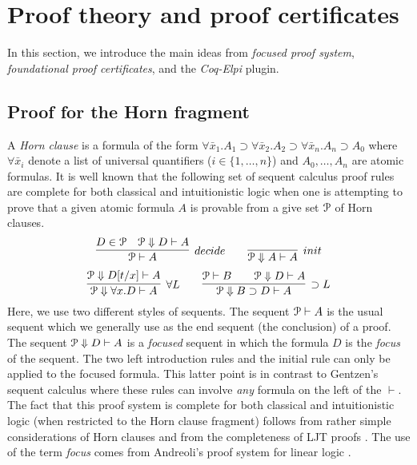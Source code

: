 \section{Proof theory and proof certificates}
\label{sec:three}

In this section, we introduce the main ideas from \emph{focused proof
  system}, \emph{foundational proof certificates}, and the
\emph{Coq-Elpi} plugin.

\subsection{Proof for the Horn fragment}
\label{ssec:focused}


A \emph{Horn clause} is a formula of the form $\forall \bar
x_1. A_1\supset \forall \bar x_2. A_2\supset \forall \bar
x_n. A_n\supset A_0$ where $\forall\bar x_i$ denote a list of
universal quantifiers ($i\in\{1,\ldots,n\}$) and $A_0,\ldots,A_n$ are
atomic formulas.  It is well known that the following set of sequent
calculus proof rules are complete for both classical and
intuitionistic logic when one is attempting to prove that a given
atomic formula $A$ is provable from a give set ${\mathcal P}$ of Horn
clauses. 
\[
  \infer[decide]{\Pscr\vdash A}
                {D \in \Pscr\quad \Pscr\Downarrow D\vdash A}
  \qquad
  \infer[init]{\Pscr\Downarrow A\vdash A}{}
\]
\[
  \infer[\forall L]{\Pscr\Downarrow\forall x. D\vdash A}
        {\Pscr\Downarrow D[t/x]\vdash A}
  \qquad
  \infer[\supset L]{\Pscr\Downarrow B\supset D\vdash A}
        {\Pscr\vdash B\qquad \Pscr\Downarrow D\vdash A}
\]
Here, we use two different styles of sequents.  The sequent
${\mathcal P}\vdash A$ is the usual sequent which we generally use as the end
sequent (the conclusion) of a proof.  The sequent ${\mathcal P}\Downarrow
D\vdash A$ is a \emph{focused} sequent in which the formula $D$ is the
\emph{focus} of the sequent.  The two left introduction rules and the
initial rule can only be applied to the focused formula.  This latter
point is in contrast to Gentzen's sequent calculus where these rules
can involve \emph{any} formula on the left of the $\vdash$.  The fact
that this proof system is complete for both classical and
intuitionistic logic (when restricted to the Horn clause fragment)
follows from rather simple considerations of Horn clauses
\cite{nadathur90jacm} and from the completeness of LJT proofs
\cite{Herbelin94}.  The use of the term \emph{focus} comes from
Andreoli's proof system for linear logic \cite{andreoli92jlc}.

